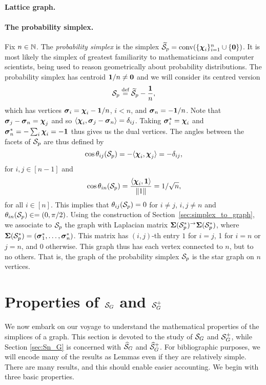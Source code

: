 \paragraph{Lattice graph.} \todo



\paragraph{The probability simplex.} 
Fix  $n\in\mathbb{N}$. The \emph{probability simplex} is the simplex $\widetilde{\mathcal{S}}_p=\textnormal{conv}(\{\boldsymbol{\chi}_i\}_{i=1}^n \cup \{\vb{0}\})$. It is most likely the simplex of greatest familiarity to mathematicians and computer scientists, being used to reason geometrically about probability distributions. The probability simplex has centroid $\vb{1}/n\neq\vb{0}$ and we will consider its centred version 
\[\mathcal{S}_p \overset{\text{def}}{=} \widetilde{\mathcal{S}}_p -  \frac{\vb{1}}{n},\]
which has vertices  $\vb*{\sigma}_i = \boldsymbol{\chi}_i - \vb{1}/n$, $i<n$, and $\vb*{\sigma}_n = -\vb{1}/n$. Note that $\vb*{\sigma}_j-\vb*{\sigma}_n = \boldsymbol{\chi}_j$ and so 
$\langle \boldsymbol{\chi}_i, \vb*{\sigma}_j-\vb*{\sigma}_n\rangle = \delta_{ij}$. Taking  $\vb*{\sigma}_i^* = \boldsymbol{\chi}_i$ and $\vb*{\sigma}_n^* = -\sum_i \boldsymbol{\chi}_i = -\vb{1}$ thus gives us the dual vertices. The  angles between the facets of $\mathcal{S}_p$ are thus defined by 
\begin{equation*}
\cos\theta_{ij}(\mathcal{S}_p) = - \langle \boldsymbol{\chi}_i,\boldsymbol{\chi}_j\rangle = -\delta_{ij}, 
\end{equation*}
for $i,j\in[n-1]$ and 
\begin{equation*}
\cos\theta_{in}(\mathcal{S}_p) = \frac{\langle \boldsymbol{\chi}_i,\vb{1}\rangle}{\norm{1}} = 1/\sqrt{n},
\end{equation*}
for all $i\in[n]$. 
This implies  that $\theta_{ij}(\mathcal{S}_p) = 0$ for $i\neq j$, $i,j\neq n$ and $\theta_{in}(\mathcal{S}_p) \in =(0,\pi/2)$. 
Using the  construction of Section~\ref{sec:simplex_to_graph}, we  associate to $\mathcal{S}_p$ the graph with Laplacian matrix $\boldsymbol{\Sigma}(\mathcal{S}_p^*)^\to \boldsymbol{\Sigma}(\mathcal{S}_p^*)$, where $\boldsymbol{\Sigma}(\mathcal{S}_p^*)=(\vb*{\sigma}_1^*,\dots,\vb*{\sigma}_n^*)$. This matrix has $(i,j)$-th  entry $1$ for $i=j$, 1  for $i=n$ or $j=n$,  and 0 otherwise. This graph thus has each vertex connected  to $n$, but to  no others.  That  is, the graph of the probability simplex $\mathcal{S}_p$ is  the star graph on  $n$ vertices. 

 



\section{Properties of \texorpdfstring{$\mathcal{S}_G$}{the Combinatorial Simplex} and \texorpdfstring{$\mathcal{S}_G^+$}{its inverse}}
\label{sec:S_G}
We now embark on our voyage to understand the mathematical properties of the simplices of a graph. This section is devoted to the study of $\mathcal{S}_G$ and $\mathcal{S}_G^+$, while Section \ref{sec:Sn_G} is concerned with $\widehat{\mathcal{S}}_G$ and $\widehat{\mathcal{S}}_G^+$. For bibliographic purposes, we will encode many of the results as Lemmas even if they are relatively simple. There are many results, and this should enable easier accounting. We begin with three basic properties.

